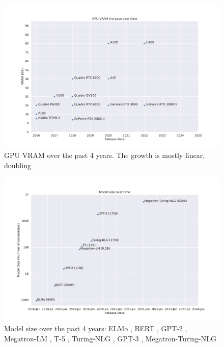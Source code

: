 \begin{figure}[h]
    \caption{GPU VRAM over the past 4 years. The growth is mostly linear, doubling }
    \label{fig:gpu-vram-over-time}
    \includegraphics[width=\textwidth]{./figures/gpu-vram-over-time.pdf}
\end{figure}

\begin{figure}[h]
    \caption{Model size over the past 4 years: ELMo \cite{peters2018elmo}, BERT \cite{devlin2018bert}, GPT-2 \cite{radford2019language}, Megatron-LM \cite{shoeybi2019megatronlm}, T-5 \cite{raffael2019t5}, Turing-NLG \cite{microsoft2020turingnlg}, GPT-3 \cite{brown2020gpt3}, Megatron-Turing-NLG \cite{smith2022megatronturingnlg}}
    \label{fig:model-size-over-time}
    \includegraphics[width=\textwidth]{./figures/model-size-over-time.pdf}
\end{figure}

